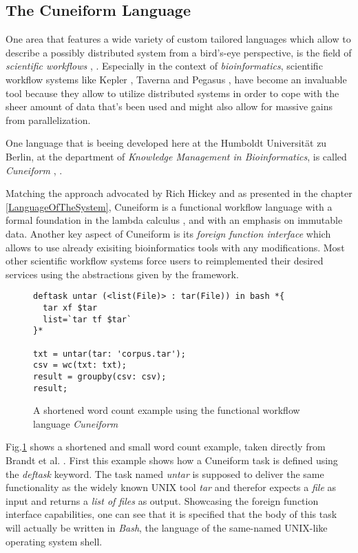 \subsection{The Cuneiform Language}
\label{cuneiform}

One area that features a wide variety of custom tailored languages
which allow to describe a possibly distributed system from a
bird's-eye perspective, is the field of \textit{scientific workflows}
\cite{kepler}, \cite{swf-survey}.
Especially in the context of \textit{bioinformatics}, scientific
workflow systems like Kepler \cite{kepler}, Taverna \cite{taverna}
and Pegasus \cite{pegasus2004}, \cite{pegasus2005} have become an
invaluable tool because they allow to utilize distributed systems
in order to cope with the sheer amount of data that's been used and
might also allow for massive gains from parallelization.

One language that is beeing developed here at the Humboldt
Universität zu Berlin, at the department of \textit{Knowledge Management
in Bioinformatics}, is called \textit{Cuneiform}
\cite{cuneiform}, \cite{saasfee}.

Matching the approach advocated by Rich Hickey and as presented in
the chapter \ref{LanguageOfTheSystem}, Cuneiform is a functional
workflow language with a formal foundation in the lambda calculus
\cite{lambdachurch}, \cite{lambda-calc} and with an emphasis on
immutable data. Another key aspect of Cuneiform is its
\textit{foreign function interface} which allows to use already
exisiting bioinformatics tools with any modifications. Most
other scientific workflow systems force users to reimplemented
their desired services using the abstractions given by the framework.

\begin{figure}[h]
    \begin{lstlisting}
deftask untar (<list(File)> : tar(File)) in bash *{
  tar xf $tar
  list=`tar tf $tar`
}*

txt = untar(tar: 'corpus.tar');
csv = wc(txt: txt);
result = groupby(csv: csv);
result;

    \end{lstlisting}
  \caption{A shortened word count example using the functional workflow
           language \textit{Cuneiform}}
  \label{cf-example}
\end{figure}

Fig.\ref{cf-example} shows a shortened and small word count example,
taken directly from Brandt et al. \cite{cuneiform}. First this
example shows how a Cuneiform task is defined using the \textit{deftask}
keyword. The task named \textit{untar} is supposed to deliver the
same functionality as the widely known UNIX tool \textit{tar} and
therefor expects a \textit{file} as
input and returns a \textit{list of files} as output. Showcasing the
foreign function interface capabilities, one can see that it is
specified that the body of this task will actually be written in
\textit{Bash}, the language of the same-named UNIX-like operating
system shell.

